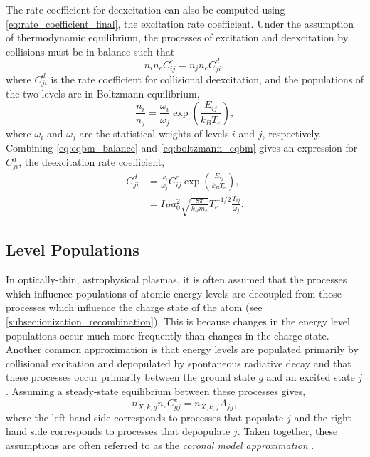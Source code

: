 The rate coefficient for deexcitation can also be computed using \autoref{eq:rate_coefficient_final}, the excitation rate coefficient. Under the assumption of thermodynamic equilibrium, the processes of excitation and deexcitation by collisions must be in balance such that 
\begin{equation}\label{eq:eqbm_balance}
    n_in_eC_{ij}^e = n_jn_eC_{ji}^d,
\end{equation}
where $C_{ji}^d$ is the rate coefficient for collisional deexcitation, and the populations of the two levels are in Boltzmann equilibrium,
\begin{equation}\label{eq:boltzmann_eqbm}
    \frac{n_i}{n_j} = \frac{\omega_i}{\omega_j}\exp{\left(\frac{E_{ij}}{k_BT_e}\right)},
\end{equation}
where $\omega_i$ and $\omega_j$ are the statistical weights of levels $i$ and $j$, respectively. Combining \autoref{eq:eqbm_balance} and \autoref{eq:boltzmann_eqbm} gives an expression for $C_{ji}^d$, the deexcitation rate coefficient,
\begin{align}\label{eq:dex_rate_coefficient}
    C_{ji}^d &= \frac{\omega_i}{\omega_j}C_{ij}^e\exp{\left(\frac{E_{ij}}{k_BT_e}\right)},\nonumber\\
    &= I_Ha_0^2\sqrt{\frac{8\pi}{k_Bm_e}}T_e^{-1/2}\frac{\Upsilon_{ij}}{\omega_j}.
\end{align}

\subsection{Level Populations}\label{subsec:level_pops}

In optically-thin, astrophysical plasmas, it is often assumed that the processes which influence populations of atomic energy levels are decoupled from those processes which influence the charge state of the atom (see \autoref{subsec:ionization_recombination}). This is because changes in the energy level populations occur much more frequently than changes in the charge state. Another common approximation is that energy levels are populated primarily by collisional excitation and depopulated by spontaneous radiative decay and that these processes occur primarily between the ground state $g$ and an excited state $j$. Assuming a steady-state equilibrium between these processes gives,
\begin{equation}\label{eq:coronal_model}
    n_{X,k,g}n_eC_{gj}^e = n_{X,k,j}A_{jg},
\end{equation}
where the left-hand side corresponds to processes that populate $j$ and the right-hand side corresponds to processes that depopulate $j$. Taken together, these assumptions are often referred to as the \textit{coronal model approximation} \citep{bradshaw_collisional_2013,del_zanna_solar_2018}. 

